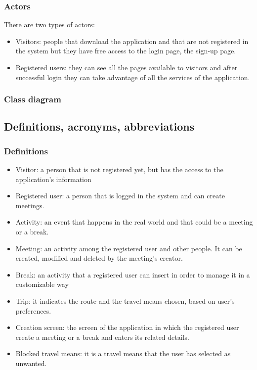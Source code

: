 \documentclass[12pt,titlepage]{article}
\begin{document}
\begin{itemize}
 \end{itemize}
\subsubsection{Actors}\label{RASD}
There are two types of actors:
\begin{itemize}
\item Visitors: people that download the application and that are not registered in the system but they have free access to the login page, the sign-up page.
\item Registered users: they can see all the pages available to visitors and after successful login they can take advantage of all the services of the application.

\end{itemize}

\subsubsection{Class diagram}\label{sec:mod1}

\subsection{Definitions, acronyms, abbreviations}\label{RASD}
\subsubsection{Definitions}\label{RASD}
\begin{itemize}
\item Visitor: a person that is not registered yet, but has the access to the application's information 
\item	Registered user: a person that is logged in the system and can create meetings.
\item	Activity: an event that happens in the real world and that could be a meeting or a break.
\item	Meeting: an activity among the registered user and other people. It can be created, modified and deleted by the meeting's creator. 
\item	Break: an activity that a registered user can insert in order to manage it in a customizable way
\item Trip: it indicates the route and the travel means chosen, based on user's preferences.
\item	Creation screen: the screen of the application in which the registered user create a meeting or a break and enters its related details.
\item Blocked travel means: it is a travel means that the user has selected as unwanted.
\end{itemize}
\end{document}
